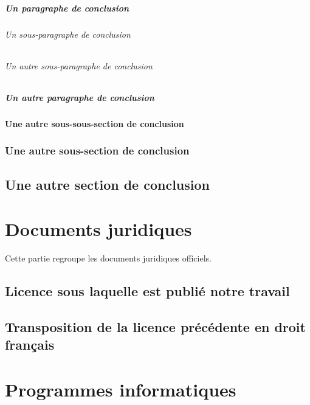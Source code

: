 \documentclass[12pt,space=onehalf,version=final]{yathesis}
\begin{document}
\paragraph{Un paragraphe de conclusion}
\lipsum[36-38]
\subparagraph{Un sous-paragraphe de conclusion}
\lipsum[39-41]
\subparagraph{Un autre sous-paragraphe de conclusion}
\lipsum[39-41]
\paragraph{Un autre paragraphe de conclusion}
\lipsum[36-38]
\subsubsection{Une autre sous-sous-section de conclusion}
\lipsum[31-37]
\subsection{Une autre sous-section de conclusion}
\lipsum[29-31]
\section{Une autre section de conclusion}
\lipsum[28-43]
%
\printbibliography
%
\appendix
%
\chapter{Documents juridiques}
\label{chap-juridique}

Cette partie regroupe les documents juridiques officiels.

\section{Licence sous laquelle est publié notre travail}
\label{sec-discours}

\lipsum[11-30]

\section{Transposition de la licence précédente en droit français}
\label{sec-autre-discours}

\lipsum[31-50]
\chapter{Programmes informatiques}
\label{chap-listings}
\end{document}
